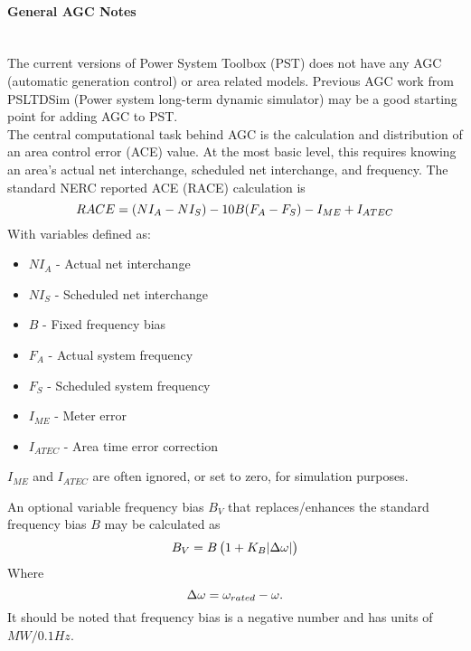 \documentclass[12pt]{article}
\begin{document}
\onehalfspacing
\paragraph{General AGC Notes} \ \\
The current versions of Power System Toolbox (PST) does not have any AGC (automatic generation control) or area related models. 
Previous AGC work from PSLTDSim (Power system long-term dynamic simulator) may be a good starting point for adding AGC to PST. \\

The central computational task behind AGC is the calculation and distribution of an area control error (ACE) value.
At the most basic level, this requires knowing an area’s actual net interchange, scheduled net interchange, and frequency.
The standard NERC reported ACE (RACE) calculation is 
\begin{equation}{\label{eq: race} }
RACE = (NI_A - NI_S) - 10B (F_A - F_S) - I_{ME} + I_{ATEC}  
\end{equation}%
With variables defined as:
\begin{itemize}
\item $NI_A$ - Actual net interchange
\item $NI_S$ - Scheduled net interchange
\item $B$ - Fixed frequency bias
\item $F_A$ - Actual system frequency
\item $F_S$ - Scheduled system frequency
\item $I_{ME}$ - Meter error 
\item $I_{ATEC}$ - Area time error correction
\end{itemize}
$I_{ME}$ and $I_{ATEC}$ are often ignored, or set to zero, for simulation purposes.

An optional variable frequency bias $B_V$  that replaces/enhances the standard frequency bias $B$ may be calculated as 
\begin{equation}{\label{eq:varibaleBias} }
B_V = B\left( 1 + K_B \abs{\Delta \omega} \right)
\end{equation}%
Where
\begin{equation}{\label{eq:speed-deviation} }
\Delta\omega = \omega_{rated} - \omega.
\end{equation}%
It should be noted that frequency bias is a negative number and has units of $MW/0.1Hz$.
\end{document}
